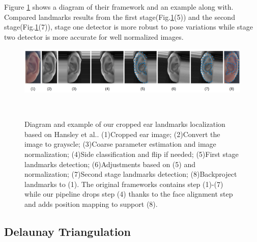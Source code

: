 Figure \ref{fig:hansley-example} shows a diagram of their framework and an example along with. Compared landmarks results from the first stage(Fig.\ref{fig:hansley-example}(5)) and the second stage(Fig.\ref{fig:hansley-example}(7)), stage one detector is more robust to pose variations while stage two detector is more accurate for well normalized images.
\begin{figure}
  \centering
    \includegraphics[width=\textwidth]{figures/hansley-example.png}
    \caption{Diagram and example of our cropped ear landmarks localization based on Hansley et al.\cite{hansley2018employing}. (1)Cropped ear image; (2)Convert the image to grayscle; (3)Coarse parameter estimation and image normalization; (4)Side classification and flip if needed; (5)First stage landmarks detection; (6)Adjustments based on (5) and normalization; (7)Second stage landmarks detection; (8)Backproject landmarks to (1). The original frameworks contains step (1)-(7) while our pipeline drops step (4) thanks to the face alignment step and adds position mapping to support (8).}~\label{fig:hansley-example}
\end{figure}

\subsection{Delaunay Triangulation}
\label{sec:triangulation}

